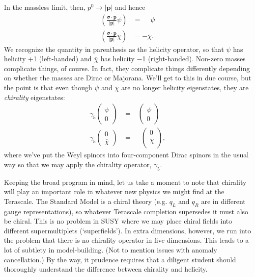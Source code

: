 In the massless limit, then, $p^0\rightarrow |\mathbf p|$ and hence 
\begin{align}
    \left(\frac{\mathbf\sigma\cdot\mathbf p}{|\mathbf{p}|}\psi\right) &= \phantom+ \psi\\
    \left(\frac{\mathbf\sigma\cdot\mathbf p}{|\mathbf{p}|}\overline\chi\right) &= -\overline\chi.
\end{align}
We recognize the quantity in parenthesis as the helicity operator, so that $\psi$ has helicity +1 (left-handed) and $\overline\chi$ has helicity $-$1 (right-handed). Non-zero masses complicate things, of course. In fact, they complicate things differently depending on whether the masses are Dirac or Majorana. We'll get to this in due course, but the point is that even though $\psi$ and $\overline\chi$ are no longer helicity eigenstates, they are \emph{chirality} eigenstates:
\begin{align}
    \gamma_5\begin{pmatrix}\psi\\0\end{pmatrix} &= -\begin{pmatrix}\psi\\0\end{pmatrix}\\
    \gamma_5\begin{pmatrix}0\\\overline\chi\end{pmatrix} &=\phantom - \begin{pmatrix}0\\\overline\chi\\\end{pmatrix},
\end{align}
where we've put the Weyl spinors into four-component Dirac spinors in the usual way so that we may apply the chirality operator, $\gamma_5$. %
\begin{example}
Keeping the broad program in mind, let us take a moment to note that chirality will play an important role in whatever new physics we might find at the Terascale. The Standard Model is a chiral theory (e.g. $q_L$ and $q_R$ are in different gauge representations), so whatever Terascale completion supersedes it must also be chiral. This is no problem in SUSY where we may place chiral fields into different supermultiplets (`superfields'). In extra dimensions, however, we run into the problem that there is no chirality operator in five dimensions. This leads to a lot of subtlety in model-building. (Not to mention issues with anomaly cancellation.) By the way, it prudence requires that a diligent student should thoroughly understand the difference between chirality and helicity.
\end{example}







